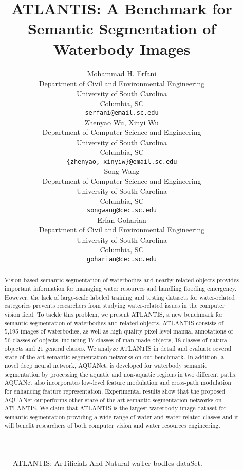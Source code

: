 \documentclass{article}
\title{ATLANTIS: A Benchmark for Semantic Segmentation of Waterbody Images
}
\author{
  Mohammad H. Erfani \\
  Department of Civil and Environmental Engineering \\
  University of South Carolina \\
  Columbia, SC\\
  \texttt{serfani@email.sc.edu} \\
\And
  Zhenyao Wu, Xinyi Wu \\
  Department of Computer Science and Engineering \\
  University of South Carolina \\
  Columbia, SC\\
  \texttt{\{zhenyao, xinyiw\}@email.sc.edu} \\
    \And
  Song Wang \\
  Department of Computer Science and Engineering \\
  University of South Carolina \\
  Columbia, SC\\
  \texttt{songwang@cec.sc.edu} \\
    \And
  Erfan Goharian \\
  Department of Civil and Environmental Engineering \\
  University of South Carolina \\
  Columbia, SC\\
  \texttt{goharian@cec.sc.edu} \\
}
\begin{document}
\maketitle


\begin{figure}[htbp]
    \centering
    \caption{ATLANTIS: ArTificiaL And Natural waTer-bodIes dataSet.}
    \label{fig:atlantis}
\end{figure}

\begin{abstract}
    Vision-based semantic segmentation of waterbodies and nearby related objects provides important information for managing water resources and handling flooding emergency. However, the lack of large-scale labeled training and testing datasets for water-related categories prevents researchers from studying water-related issues in the computer vision field. To tackle this problem, we present ATLANTIS, a new benchmark for semantic segmentation of waterbodies and related objects. ATLANTIS consists of 5,195 images of waterbodies, as well as high quality pixel-level manual annotations of 56 classes of objects, including 17 classes of man-made objects, 18 classes of natural objects and 21 general classes. 
    We analyze ATLANTIS in detail and evaluate several state-of-the-art semantic segmentation networks on our benchmark. In addition, a novel deep neural network, AQUANet, is developed for waterbody semantic segmentation by processing the aquatic and non-aquatic regions in two different paths. AQUANet also incorporates low-level feature modulation and cross-path modulation for enhancing feature representation. Experimental results show that the proposed AQUANet outperforms other state-of-the-art semantic segmentation networks on ATLANTIS. We claim that ATLANTIS is the largest waterbody image dataset for semantic segmentation providing a wide range of water and water-related classes and it will benefit researchers of both computer vision and water resources engineering.
\end{abstract}
\end{document}
